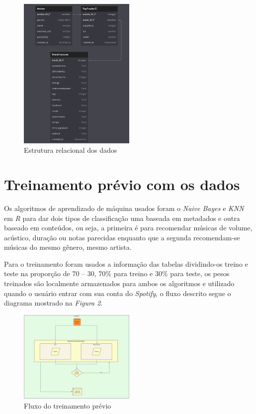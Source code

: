 \documentclass[12pt, %
openright, 
oneside, %
a4paper,    %
brazil]{facom-ufu-abntex2}
\begin{document}
\begin{figure}[h]
  \centering
  \includegraphics[width=0.5\textwidth]{Basic Relashionship}
  \caption{Estrutura relacional dos dados}
\end{figure}

\section{Treinamento prévio com os dados}

Os algoritmos de aprendizado de máquina usados foram o \textit{Naive Bayes} e \textit{KNN} em \textit{R} para dar dois tipos de classificação uma baseada em metadados e outra baseado em conteúdos, ou seja, a primeira é para recomendar músicas de volume, acústico, duração ou notas parecidas enquanto que a segunda recomendam-se músicas do mesmo gênero, mesmo artista.

Para o treinamento foram usados a informação das tabelas dividindo-os treino e teste na proporção de 70 – 30, 70\% para treino e 30\% para teste, os pesos treinados são localmente armazenados para ambos os algoritmos e utilizado quando o usuário entrar com sua conta do \textit{Spotify}, o fluxo descrito segue o diagrama mostrado na \textit{Figura 2}.

\begin{figure}[h]
  \centering
  \includegraphics[width=0.5\textwidth]{Diagrama}
  \caption{Fluxo do treinamento prévio}
\end{figure}
\end{document}
